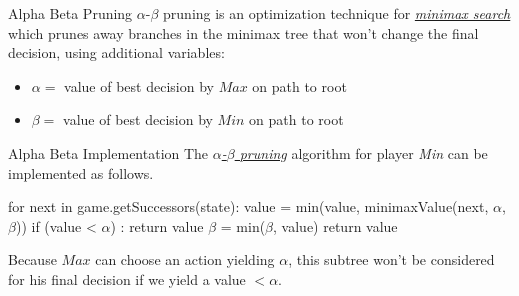 \documentclass{cognito}
\begin{document}
\begin{note}{Alpha Beta Pruning}
	$\alpha$-$\beta$ pruning is an optimization technique for \hyperref[note:Minimax Algorithm]{\it minimax search}
	which prunes away branches in the minimax tree that won't change the final decision, using additional variables:
	\begin{itemize}
		\item $\alpha =$ value of best decision by $Max$ on path to root
		\item $\beta =$ value of best decision by $Min$ on path to root
	\end{itemize}
\end{note}

\begin{note}{Alpha Beta Implementation}
	The \hyperref[note:Alpha Beta Pruning]{\it $\alpha$-$\beta$ pruning} algorithm  for player \textit{Min} can be implemented as follows.
	\begin{code}
for next in game.getSuccessors(state):
	value = min(value, minimaxValue(next, $\alpha$, $\beta$))
	if (value < $\alpha$) : return value
	$\beta$ = min($\beta$, value)
return value
	\end{code}
	Because $Max$ can choose an action yielding $\alpha$, this subtree won't be considered for his
	final decision if we yield a value $< \alpha$.
	
\end{note}

\end{document}
